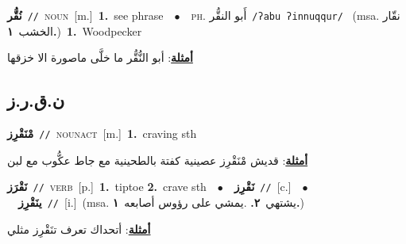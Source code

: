 \documentclass[10pt,a4paper,twoside]{article} %
\begin{document}
\begin{multicols}{2}
{\setlength\topsep{0pt}\textbf{\foreignlanguage{arabic}{نُقُّر}}\ {\color{gray}\texttt{//}\color{black}}\ \textsc{noun}\ [m.]\ \textbf{1.}~see phrase\ \ $\bullet$\ \ \textsc{ph.} \color{gray} \foreignlanguage{arabic}{أَبو النقُّر}\color{black}\ {\color{gray}\texttt{/{\sffamily ʔabu ʔinnuqqur}/}\color{black}}\ \color{gray} (msa. \foreignlanguage{arabic}{نقّار الخشب}~\foreignlanguage{arabic}{\textbf{١.}})\color{black}\ \textbf{1.}~Woodpecker\  \begin{flushright}\color{gray}\foreignlanguage{arabic}{\textbf{\underline{\foreignlanguage{arabic}{أمثلة}}}: أبو النُّقُّر  ما خلَّى ماصورة الا خزقها}\end{flushright}\color{black}} \vspace{2mm}

\vspace{-3mm}
\subsection*{\color{blue}\foreignlanguage{arabic}{ن.ق.ر.ز}\color{blue}{}} 

{\setlength\topsep{0pt}\textbf{\foreignlanguage{arabic}{مْنَقْرِز}}\ {\color{gray}\texttt{//}\color{black}}\ \textsc{noun\textunderscore act}\ [m.]\ \textbf{1.}~craving sth\  \begin{flushright}\color{gray}\foreignlanguage{arabic}{\textbf{\underline{\foreignlanguage{arabic}{أمثلة}}}: قديش مْنَقْرِز عصينية كفتة بالطحينية مع جاط عكُّوب مع لبن}\end{flushright}\color{black}} \vspace{2mm}

{\setlength\topsep{0pt}\textbf{\foreignlanguage{arabic}{نَقْرَز}}\ {\color{gray}\texttt{//}\color{black}}\ \textsc{verb}\ [p.]\ \textbf{1.}~tiptoe  \textbf{2.}~crave sth\ \ $\bullet$\ \ \setlength\topsep{0pt}\textbf{\foreignlanguage{arabic}{نَقْرِز}}\ {\color{gray}\texttt{//}\color{black}}\ [c.]\ \ $\bullet$\ \ \setlength\topsep{0pt}\textbf{\foreignlanguage{arabic}{ينَقْرِز}}\ {\color{gray}\texttt{//}\color{black}}\ [i.]\ \color{gray}(msa. \foreignlanguage{arabic}{يشتهي}~\foreignlanguage{arabic}{\textbf{٢.}}  .\foreignlanguage{arabic}{يمشي على رؤوس أصابعه}~\foreignlanguage{arabic}{\textbf{١.}})\color{black}\  \begin{flushright}\color{gray}\foreignlanguage{arabic}{\textbf{\underline{\foreignlanguage{arabic}{أمثلة}}}: أتحداك تعرف تنَقْرِز مثلي}\end{flushright}\color{black}} \vspace{2mm}


\end{multicols}
\end{document}
